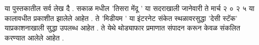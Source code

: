 या पुस्तकातील सर्व लेख दै . सकाळ मधील 'तिसरा मेंदू '  या सदराखाली जानेवारी ते मार्च २ ० २ ५  या कालावधीत प्रकाशीत झालेले आहेत .  ते 'मिडीयम ' या इंटरनेट संकेत स्थळावरसुद्धा 'देसी स्टॅक' याप्रकाशनाखाली सुद्धा उपलब्ध आहेत .  ते येथे थोड्याफार प्रमाणात संपादन करून केवळ संकलित करण्यात आलेले आहेत . 